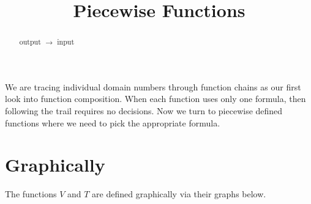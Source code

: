 \documentclass{ximera}
\title{Piecewise Functions}
\begin{document}
\begin{abstract}
output $\rightarrow$ input
\end{abstract}
\maketitle


We are tracing individual domain numbers through function chains as our first look into function composition.  When each function uses only one formula, then following the trail requires no decisions.  Now we turn to piecewise defined functions where we need to pick the appropriate formula.








\section{Graphically}




The functions $V$ and $T$ are defined graphically via their graphs below.  
\end{document}
